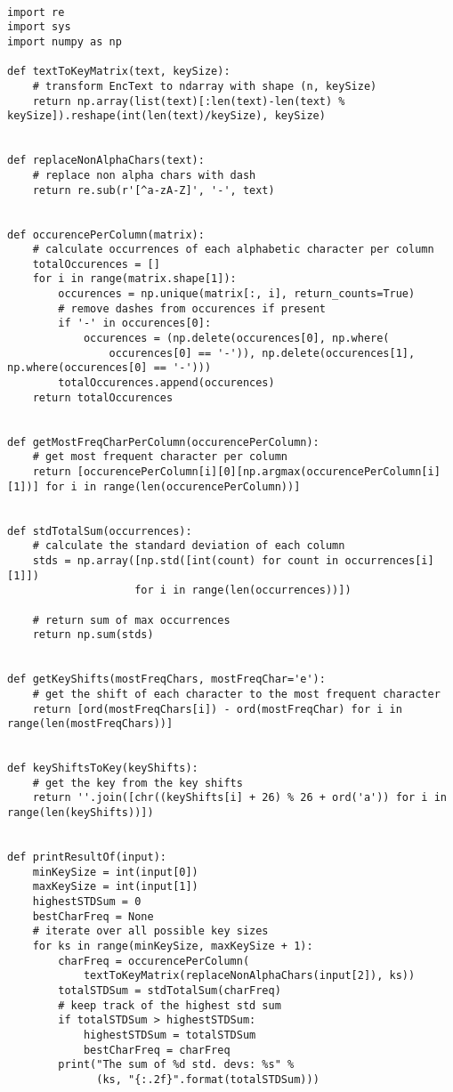 \documentclass{report}
\begin{document}
\begin{lstlisting}

import re
import sys
import numpy as np

def textToKeyMatrix(text, keySize):
    # transform EncText to ndarray with shape (n, keySize)
    return np.array(list(text)[:len(text)-len(text) % keySize]).reshape(int(len(text)/keySize), keySize)


def replaceNonAlphaChars(text):
    # replace non alpha chars with dash
    return re.sub(r'[^a-zA-Z]', '-', text)


def occurencePerColumn(matrix):
    # calculate occurrences of each alphabetic character per column
    totalOccurences = []
    for i in range(matrix.shape[1]):
        occurences = np.unique(matrix[:, i], return_counts=True)
        # remove dashes from occurences if present
        if '-' in occurences[0]:
            occurences = (np.delete(occurences[0], np.where(
                occurences[0] == '-')), np.delete(occurences[1], np.where(occurences[0] == '-')))
        totalOccurences.append(occurences)
    return totalOccurences


def getMostFreqCharPerColumn(occurencePerColumn):
    # get most frequent character per column
    return [occurencePerColumn[i][0][np.argmax(occurencePerColumn[i][1])] for i in range(len(occurencePerColumn))]


def stdTotalSum(occurrences):
    # calculate the standard deviation of each column
    stds = np.array([np.std([int(count) for count in occurrences[i][1]])
                    for i in range(len(occurrences))])

    # return sum of max occurrences
    return np.sum(stds)


def getKeyShifts(mostFreqChars, mostFreqChar='e'):
    # get the shift of each character to the most frequent character
    return [ord(mostFreqChars[i]) - ord(mostFreqChar) for i in range(len(mostFreqChars))]


def keyShiftsToKey(keyShifts):
    # get the key from the key shifts
    return ''.join([chr((keyShifts[i] + 26) % 26 + ord('a')) for i in range(len(keyShifts))])


def printResultOf(input):
    minKeySize = int(input[0])
    maxKeySize = int(input[1])
    highestSTDSum = 0
    bestCharFreq = None
    # iterate over all possible key sizes
    for ks in range(minKeySize, maxKeySize + 1):
        charFreq = occurencePerColumn(
            textToKeyMatrix(replaceNonAlphaChars(input[2]), ks))
        totalSTDSum = stdTotalSum(charFreq)
        # keep track of the highest std sum
        if totalSTDSum > highestSTDSum:
            highestSTDSum = totalSTDSum
            bestCharFreq = charFreq
        print("The sum of %d std. devs: %s" %
              (ks, "{:.2f}".format(totalSTDSum)))


\end{lstlisting}
\end{document}
